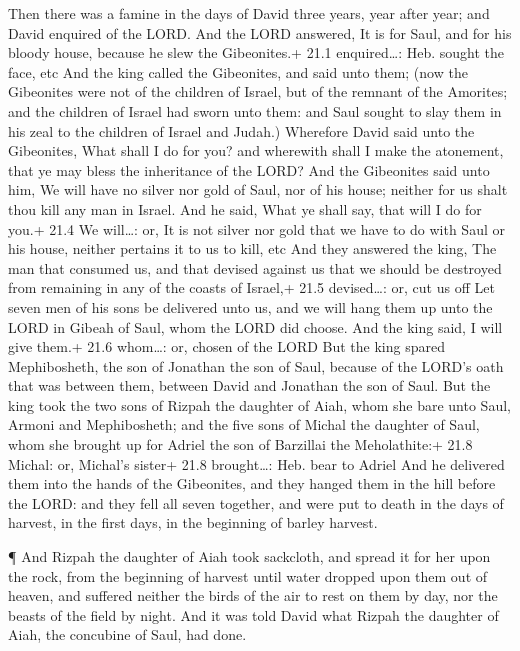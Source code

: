  Then there was a famine in the days of David three years,
year after year; and David enquired of the LORD. And the LORD answered,
It is for Saul, and for his bloody house, because he slew the
Gibeonites.+ 21.1 enquired\ldots: Heb. sought the face, etc 
And the king called the Gibeonites, and said unto them; (now the
Gibeonites were not of the children of Israel, but of the remnant of the
Amorites; and the children of Israel had sworn unto them: and Saul
sought to slay them in his zeal to the children of Israel and Judah.)
 Wherefore David said unto the Gibeonites, What shall I do
for you? and wherewith shall I make the atonement, that ye may bless the
inheritance of the LORD?  And the Gibeonites said unto him,
We will have no silver nor gold of Saul, nor of his house; neither for
us shalt thou kill any man in Israel. And he said, What ye shall say,
that will I do for you.+ 21.4 We will\ldots: or, It is not silver nor
gold that we have to do with Saul or his house, neither pertains it to
us to kill, etc  And they answered the king, The man that
consumed us, and that devised against us that we should be destroyed
from remaining in any of the coasts of Israel,+ 21.5 devised\ldots: or,
cut us off  Let seven men of his sons be delivered unto us,
and we will hang them up unto the LORD in Gibeah of Saul, whom the LORD
did choose. And the king said, I will give them.+ 21.6 whom\ldots: or,
chosen of the LORD  But the king spared Mephibosheth, the
son of Jonathan the son of Saul, because of the LORD's oath that was
between them, between David and Jonathan the son of Saul. 
But the king took the two sons of Rizpah the daughter of Aiah, whom she
bare unto Saul, Armoni and Mephibosheth; and the five sons of Michal the
daughter of Saul, whom she brought up for Adriel the son of Barzillai
the Meholathite:+ 21.8 Michal: or, Michal's sister+ 21.8 brought\ldots:
Heb. bear to Adriel  And he delivered them into the hands of
the Gibeonites, and they hanged them in the hill before the LORD: and
they fell all seven together, and were put to death in the days of
harvest, in the first days, in the beginning of barley harvest.

 ¶ And Rizpah the daughter of Aiah took sackcloth, and
spread it for her upon the rock, from the beginning of harvest until
water dropped upon them out of heaven, and suffered neither the birds of
the air to rest on them by day, nor the beasts of the field by night.
 And it was told David what Rizpah the daughter of Aiah,
the concubine of Saul, had done.

